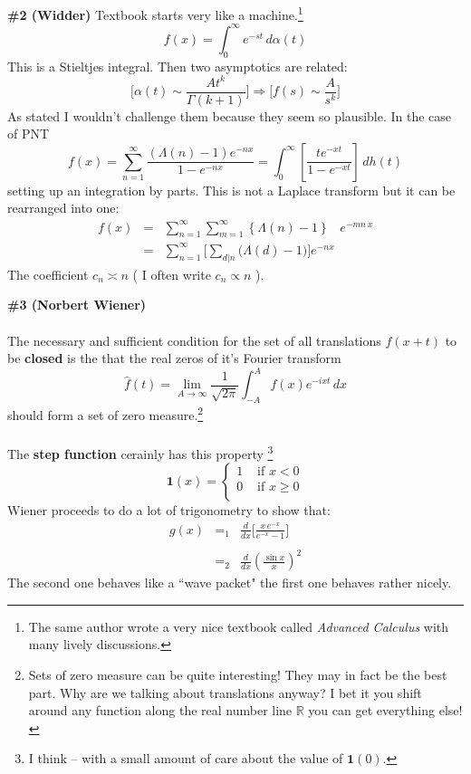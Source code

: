 \documentclass[12pt]{article}
\begin{document}
\noindent \textbf{\#2 (Widder)} Textbook starts very like a machine.\footnote{The same author wrote a very nice textbook called \textit{Advanced Calculus} with many lively discussions.}
$$ f(x) = \int_0^\infty e^{-st} \, d \alpha(t) $$
This is a Stieltjes integral.  Then two asymptotics are related:
$$
\Bigg[ \alpha(t) \sim \frac{A t^k}{\Gamma(k+1)}\Bigg] \Rightarrow \Bigg[ f(s) \sim \frac{A}{s^k} \Bigg]
 $$
 As stated I wouldn't challenge them because they seem so plausible.   In the case of PNT
 $$
f(x) = \sum_{n=1}^\infty \frac{(\Lambda(n) - 1)e^{-nx}}{1 - e^{-nx}} = \int_0^\infty \left[\frac{t e^{-xt}}{1 - e^{-xt}} \right]\, dh(t)
  $$
setting up an {\color{green}integration by parts}.  This is not a Laplace transform but it can be rearranged into one:
\begin{eqnarray*} f(x) &=& \sum_{n=1}^\infty \sum_{m=1}^\infty \left\{ \Lambda(n) - 1\right\} \;\;\;e^{-mn\,x}\\ 
&=& \sum_{n=1}^\infty \Bigg[ \sum_{d|n} \big( \Lambda(d)-1 \big) \Bigg] e^{-nx}\end{eqnarray*}
The coefficient $c_n \asymp n$ ( I often write $c_n \propto n$ ).  \newpage

\noindent \textbf{\#3 (Norbert Wiener)} \\ \\The necessary and sufficient condition for the set of all translations $f(x+t)$ to be {\color{red!50!white}\textbf{closed}} is the that the real zeros of it's Fourier transform
$$ \hat{f}(t) = \lim_{A \to \infty} \frac{1}{\sqrt{2\pi}} \int_{-A}^A f(x) e^{-ixt} \, dx $$
should form a set of zero measure.\footnote{Sets of zero measure can be quite interesting!  They may in fact be the best part.  Why are we talking about translations anyway?  I bet it you shift around any function along the real number line $\mathbb{R}$ you can get everything else!} \\ \\ The \textbf{step function} cerainly has this property
\footnote{I think -- with a small amount of care about the value of $\mathbf{1}(0)$.}   
$$ \mathbf{1}(x) = \left\{ 
\begin{array}{cc}
1 & \text{ if } x < 0 \\
0 & \text{ if } x \geq 0 \\
 \end{array} \right. $$
Wiener proceeds to do a lot of trigonometry to show that:
\begin{eqnarray*}
g(x) &=_1&  \frac{d}{dx} \bigg[\frac{x \, e^{-x}}{e^{-x}-1}\bigg] \\ \\
&=_2&  \frac{d}{dx} \left( \frac{\sin x}{x}\right)^2
\end{eqnarray*}
The second one behaves like a ``wave packet" the first one behaves rather nicely. \newpage
\end{document}
